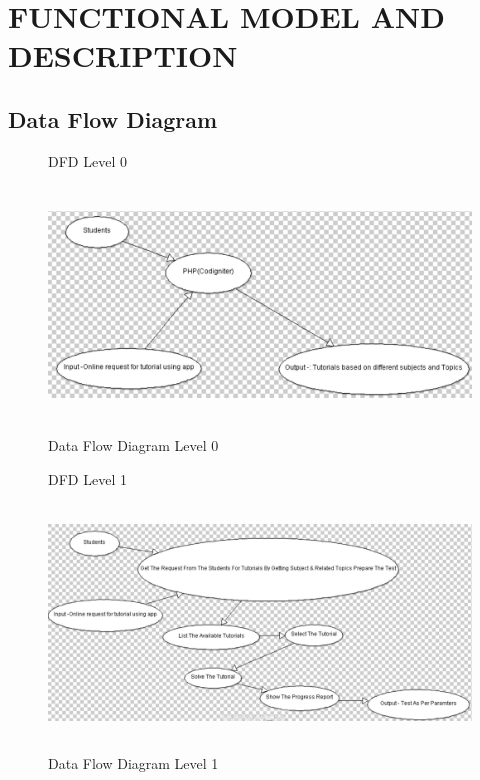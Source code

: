 \documentclass[oneside,a4paper,12pt]{report}
\begin{document}
\newpage
\section{FUNCTIONAL MODEL AND DESCRIPTION}

\subsection{Data Flow Diagram}
\begin{figure}[!h]
DFD Level 0\\
\\
\centering
\includegraphics[height=6cm,width=12cm]{dfd0.png}
\caption{Data Flow Diagram Level 0}
\end{figure}

\begin{figure}[!h]
DFD Level 1\\
\\
\centering
\includegraphics[height=6cm,width=12cm]{dfd1.png}
\caption{Data Flow Diagram Level 1}
\end{figure}
\\
\newpage
\end{document}
